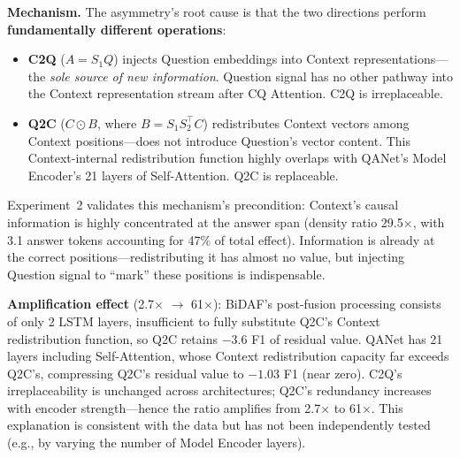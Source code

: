 \documentclass[10pt]{article}
\begin{document}
\textbf{Mechanism.} The asymmetry's root cause is that the two directions perform \textbf{fundamentally different operations}:

\begin{itemize}
\item \textbf{C2Q} ($A = S_1 Q$) injects Question embeddings into Context representations---the \emph{sole source of new information}. Question signal has no other pathway into the Context representation stream after CQ Attention. C2Q is irreplaceable.
\item \textbf{Q2C} ($C \odot B$, where $B = S_1 S_2^{\!\top} C$) redistributes Context vectors among Context positions---does not introduce Question's vector content. This Context-internal redistribution function highly overlaps with QANet's Model Encoder's 21 layers of Self-Attention. Q2C is replaceable.
\end{itemize}

Experiment~2 validates this mechanism's precondition: Context's causal information is highly concentrated at the answer span (density ratio 29.5$\times$, with 3.1 answer tokens accounting for 47\% of total effect). Information is already at the correct positions---redistributing it has almost no value, but injecting Question signal to ``mark'' these positions is indispensable.

\textbf{Amplification effect} (2.7$\times$ $\to$ 61$\times$): BiDAF's post-fusion processing consists of only 2 LSTM layers, insufficient to fully substitute Q2C's Context redistribution function, so Q2C retains $-3.6$ F1 of residual value. QANet has 21 layers including Self-Attention, whose Context redistribution capacity far exceeds Q2C's, compressing Q2C's residual value to $-1.03$ F1 (near zero). C2Q's irreplaceability is unchanged across architectures; Q2C's redundancy increases with encoder strength---hence the ratio amplifies from 2.7$\times$ to 61$\times$. This explanation is consistent with the data but has not been independently tested (e.g., by varying the number of Model Encoder layers).
\end{document}
